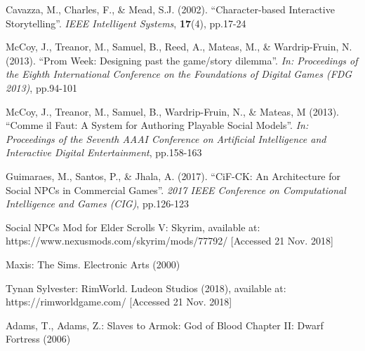 \documentclass{sig-alternate-05-2015}
\begin{document}
\begin{thebibliography}{20}
Cavazza, M., Charles, F., \& Mead, S.J. (2002).
``Character-based Interactive Storytelling''.
\textit{IEEE Intelligent Systems}, \textbf{17}(4), pp.17-24

McCoy, J., Treanor, M., Samuel, B., Reed, A., Mateas, M., \& Wardrip-Fruin, N. (2013).
``Prom Week: Designing past the game/story dilemma''.
\textit{In: Proceedings of the Eighth International Conference on the Foundations of Digital Games (FDG 2013)}, pp.94-101

McCoy, J., Treanor, M., Samuel, B., Wardrip-Fruin, N., \& Mateas, M (2013).
``Comme il Faut: A System for Authoring Playable Social Models''.
\textit{In: Proceedings of the Seventh AAAI Conference on Artificial Intelligence and Interactive Digital Entertainment}, pp.158-163

Guimaraes, M., Santos, P., \& Jhala, A. (2017).
``CiF-CK: An Architecture for Social NPCs in Commercial Games''.
\textit{2017 IEEE Conference on Computational Intelligence and Games (CIG)}, pp.126-123

Social NPCs Mod for Elder Scrolls V: Skyrim, available at: https://www.nexusmods.com/skyrim/mods/77792/ [Accessed 21 Nov. 2018]

Maxis: The Sims. Electronic Arts (2000)

Tynan Sylvester: RimWorld. Ludeon Studios (2018), available at: https://rimworldgame.com/ [Accessed 21 Nov. 2018]

Adams, T., Adams, Z.: Slaves to Armok: God of Blood Chapter II: Dwarf Fortress (2006)


\end{thebibliography}
 
\end{document}
